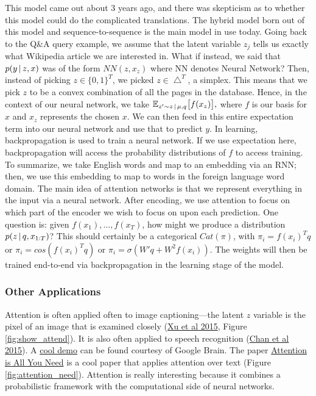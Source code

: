 \documentclass{article}
\begin{document}
This model came out about 3 years ago, and there was skepticism as to whether this model could do the complicated translations. The hybrid model born out of this model and sequence-to-sequence is the main model in use today. Going back to the Q&A query example, we assume that the latent variable $z_j$ tells us exactly what Wikipedia article we are interested in. What if instead, we said that $p(y \,|\, z, x)$ was of the form $NN(z, x_z)$ where NN denotes Neural Network? Then, instead of picking $z \in \{0,1\}^T$, we picked $z \in \bigtriangleup^T$, a simplex. This means that we pick $z$ to be a convex combination of all the pages in the database. Hence, in the context of our neural network, we take $\mathbb{E}_{z' \sim z \,|\, \mu, q} \big[f(x_z)\big],$ where $f$ is our basis for $x$ and $x_z$ represents the chosen $x$. We can then feed in this entire expectation term into our neural network and use that to predict $y$. In learning, backpropagation is used to train a neural network. If we use expectation here, backpropagation will access the probability distributions of $f$ to access training.\\

To summarize, we take English words and map to an embedding via an RNN; then, we use this embedding to map to words in the foreign language word domain. The main idea of attention networks is that we represent everything in the input via a neural network. After encoding, we use attention to focus on which part of the encoder we wish to focus on upon each prediction. One question is: given $f(x_1), \ldots, f(x_T)$, how might we produce a distribution $p(z \,|\, q, x_{1:T})$? This should certainly be a categorical $Cat(\pi)$, with $\pi_i = f(x_i)^T q$ or $\pi_i = cos(f(x_i)^T q)$ or $\pi_i = \sigma(W'q+W^2f(x_i))$. The weights will then be trained end-to-end via backpropagation in the learning stage of the model.

\subsubsection{Other Applications}

Attention is often applied often to image captioning---the latent $z$ variable is the pixel of an image that is examined closely (\href{https://arxiv.org/abs/1502.03044}{Xu et al 2015}, Figure \ref{fig:show_attend}). It is also often applied to speech recognition (\href{https://arxiv.org/abs/1508.01211}{Chan et al 2015}). A \href{https://www.distill.pub/2016/augmented-rnns/}{cool demo} can be found courtesy of Google Brain. The paper \href{https://arxiv.org/abs/1706.03762}{Attention is All You Need} is a cool paper that applies attention over text (Figure
\ref{fig:attention_need}). Attention is really interesting because it combines a probabilistic framework with the computational side of neural networks.
\end{document}
